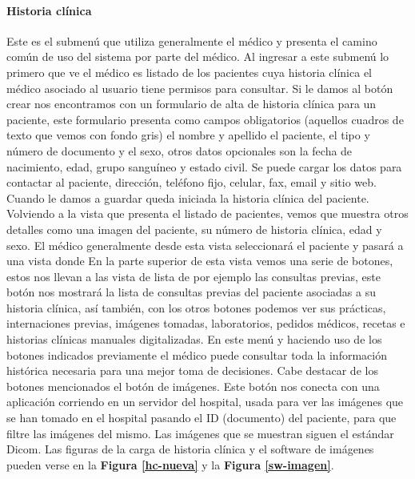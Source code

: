 \paragraph{Historia clínica}

Este es el submenú que utiliza generalmente el médico y presenta el camino común de uso del sistema por parte del médico. Al ingresar a este submenú lo primero que ve el médico es listado de los pacientes cuya historia clínica el médico asociado al usuario tiene permisos para consultar.
Si le damos al botón crear nos encontramos con un formulario de alta de historia clínica para un paciente, este formulario presenta como campos obligatorios (aquellos cuadros de texto que vemos con fondo gris) el nombre y apellido el paciente, el tipo y número de documento y el sexo, otros datos opcionales son la fecha de nacimiento, edad, grupo sanguíneo y estado civil. Se puede cargar los datos para contactar al paciente, dirección, teléfono fijo, celular, fax, email y sitio web. Cuando le damos a guardar queda iniciada la historia clínica del paciente.
Volviendo a la vista que presenta el listado de pacientes, vemos que muestra otros detalles como una imagen del paciente, su número de historia clínica, edad y sexo. El médico generalmente desde esta vista seleccionará el paciente y pasará a una vista donde
En la parte superior de esta vista vemos una serie de botones, estos nos llevan a las vista de lista de por ejemplo las consultas previas, este botón nos mostrará la lista de consultas previas del paciente asociadas a su historia clínica, así también, con los otros botones podemos ver sus prácticas, internaciones previas, imágenes tomadas, laboratorios, pedidos médicos, recetas e historias clínicas manuales digitalizadas. En este menú y haciendo uso de los botones indicados previamente el médico puede consultar toda la información histórica necesaria para una mejor toma de decisiones. 
Cabe destacar de los botones mencionados el botón de imágenes.
Este botón nos conecta con una aplicación corriendo en un servidor del hospital, usada para ver las imágenes que se han tomado en el hospital pasando el ID (documento) del paciente, para que filtre las imágenes del mismo. Las imágenes que se muestran siguen el estándar Dicom. Las figuras de la carga de historia clínica y el software de imágenes pueden verse en la \textbf{Figura \ref{hc-nueva}} y la \textbf{Figura \ref{sw-imagen}}.

